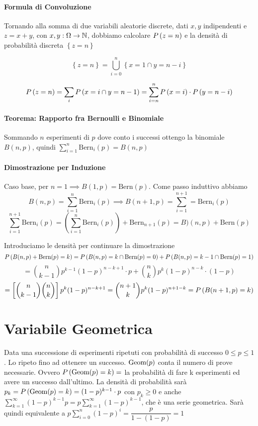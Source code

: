 \paragraph{Formula di Convoluzione}

Tornando alla somma di due variabili aleatorie discrete, dati $ x,y $ indipendenti e $ z = x + y $, con $ x,y : \Omega \to \mathbb{N} $, dobbiamo calcolare $ P\left(z = n\right) $ e la densità di probabilità discreta $ \left\{z = n\right\} $

\[ \left\{z = n\right\} = \bigcup_{i=0}^{n} \left\{x = 1 \cap y = n - i \right\} \]

\[ P\left(z=n\right) = \sum_{i} P\left(x = i \cap y = n-1\right) = \sum_{i = n}^{n} P\left(x=i\right) \cdot P\left(y=n-i\right) \]

\paragraph{Teorema: Rapporto fra Bernoulli e Binomiale}

Sommando $ n $ esperimenti di $ p $ dove conto i successi ottengo la binomiale $ B(n,p) $, quindi $ \sum_{i=1}^{n} \text{Bern}_i(p) = B(n,p) $

\paragraph{Dimostrazione per Induzione}
Caso base, per $ n = 1 \implies B(1,p) = \text{Bern}(p)$. Come passo induttivo abbiamo 
\[ B(n,p) = \sum_{i=1}^{n} \text{Bern}_i(p) \implies B(n+1,p) = \sum_{i=1}^{n+1} = \text{Bern}_i(p) \]
\[ \sum_{i=1}^{n+1} \text{Bern}_i(p) = \left( \sum_{i=1}^{n} \text{Bern}_i(p) \right) + \text{Bern}_{n+1}(p) = B)(n,p) + \text{Bern}(p) \]

Introduciamo le densità per continuare la dimostrazione
\[ P\left(B(n,p) + \text{Bern}(p) = k\right) = P\left(B(n,p) = k \cap \text{Bern}(p) = 0\right) + P\left(B(n,p) = k-1 \cap \text{Bern}(p) = 1\right) \]
\[ = \binom{n}{k-1}p^{k-1}(1-p)^{n-k+1} \cdot p + \binom{n}{k}p^k(1-p)^{n-k} \cdot  (1-p) \]
\[ = \left[\binom{n}{k-1}\binom{n}{k}\right] p^k (1-p)^{n-k+1} = \binom{n+1}{k} p^k (1-p)^{n+1-k} = P\left(B(n+1,p) = k\right)\]

\section{Variabile Geometrica}
Data una successione di esperimenti ripetuti con probabilità di successo $ 0 \leq p \leq 1 $. Lo ripeto fino ad ottenere un successo. $ \text{Geom}(p) $ conta il numero di prove necessarie. Ovvero $ P\left(\text{Geom}(p) = k\right) = $ la probabilità di fare k esperimenti ed avere un successo dall'ultimo. La densità di probabilità sarà $ p_k = P\left(\text{Geom}(p) = k\right) = (1-p)^{k-1} \cdot p $ con $ p_k \geq 0 $ e anche $ \sum_{k=1}^{\infty} (1-p)^{k-1} p = p \sum_{k=1}^{\infty}(1-p)^{k-1} $, che è una serie geometrica. Sarà quindi equivalente a $ p \sum_{i=0}^{n} (1-p)^i = \dfrac{p}{1-(1-p)} = 1$


